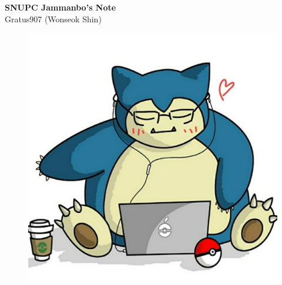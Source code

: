 \documentclass[landscape,8pt]{article}
\begin{document}
  \begin{center}
    \Huge{\textbf{SNUPC Jammanbo's Note}}\\
    \vspace{0.5em}
    \Large{Gratus907 (Wonseok Shin)}
    \vspace{-1.5em}
  \end{center}
  \begin{figure}[H]
  \begin{center}
  \includegraphics[width = 0.5\linewidth]{jammanbo.png}

  \end{center}
  \end{figure}
\end{document}
